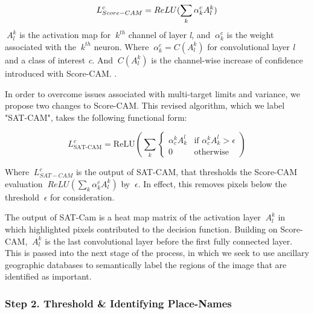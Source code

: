 \begin{equation}
\centering
L^{c}_{Score-CAM} = ReLU (\sum_{k} \alpha^{c}_{k} A^{k}_{l})  
\label{score-cam_equation}
\end{equation}
$\ A^{k}_{l} $ is the activation map for $\ k^{th} $ channel of layer \textit{l}, and $\ \alpha^{c}_{k} $ is the weight associated with the $\ k^{th} $ neuron. Where $\ \alpha^{c}_{k} = C(A^{k}_{l}) $ for convolutional layer \textit{l} and a class of interest \textit{c}. And $\ C(A^{k}_{l}) $ is the channel-wise increase of confidence introduced with Score-CAM.  \citep{wang2020score}.  

In order to overcome issues associated with multi-target limits and variance, we propose two changes to Score-CAM.  This revised algorithm, which we label "SAT-CAM", takes the following functional form:

\begin{equation}
L^{c}_{\text{SAT-CAM}} = \text{ReLU}\left(\sum_k \left\{
\begin{array}{cl}
\alpha_c^k A_k^l & \text{if } \alpha_c^k A_k^l > \epsilon \\
0 & \text{otherwise}
\end{array}
\right.\right)
\label{sat-cam_equation}
\end{equation}

Where $\ L^{c}_{SAT-CAM} $ is the output of SAT-CAM, that thresholds the Score-CAM evaluation $\ ReLU (\sum_{k} \alpha^{c}_{k} A^{k}_{l})$ by $\ \epsilon$.  In effect, this removes pixels below the threshold $\ \epsilon$ for consideration.

The output of SAT-Cam is a heat map matrix of the activation layer $\ A^{k}_{l} $ in which highlighted pixels contributed to the decision function.  Building on Score-CAM, $\ A^{k}_{l} $ is the last convolutional layer before the first fully connected layer.  This is passed into the next stage of the process, in which we seek to use ancillary geographic databases to semantically label the regions of the image that are identified as important.

\subsubsection{Step 2. Threshold \& Identifying Place-Names}

